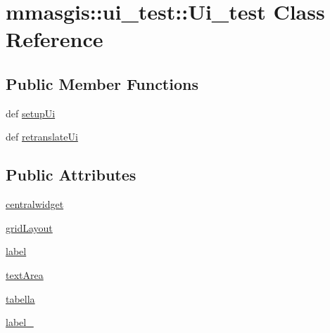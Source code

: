 \hypertarget{classmmasgis_1_1ui__test_1_1Ui__test}{
\section{mmasgis::ui\_\-test::Ui\_\-test Class Reference}
\label{classmmasgis_1_1ui__test_1_1Ui__test}
}
\subsection*{Public Member Functions}
\begin{DoxyCompactItemize}
\item 
def \hyperlink{classmmasgis_1_1ui__test_1_1Ui__test_ae1969d4be580eb1390758206e3cd04d8}{setupUi}
\item 
def \hyperlink{classmmasgis_1_1ui__test_1_1Ui__test_ac82f0dfcfc24c742d121b9e9280ff689}{retranslateUi}
\end{DoxyCompactItemize}
\subsection*{Public Attributes}
\begin{DoxyCompactItemize}
\item 
\hyperlink{classmmasgis_1_1ui__test_1_1Ui__test_a74c5eebc7d6817ee9a4bdcc5ad1a89f0}{centralwidget}
\item 
\hyperlink{classmmasgis_1_1ui__test_1_1Ui__test_a662e5a5a3ac77877b271603380979b81}{gridLayout}
\item 
\hyperlink{classmmasgis_1_1ui__test_1_1Ui__test_afb1e488ef501b26e3bc0d35c61dbc58e}{label}
\item 
\hyperlink{classmmasgis_1_1ui__test_1_1Ui__test_adeeeda83029dd748d8d45f98ac783d64}{textArea}
\item 
\hyperlink{classmmasgis_1_1ui__test_1_1Ui__test_a9b1ce89a4d93e7f27b02e993af03c2dc}{tabella}
\item 
\hyperlink{classmmasgis_1_1ui__test_1_1Ui__test_a61a24f558e7b7e95ddcaecf150290a55}{label\_}
\end{DoxyCompactItemize}


